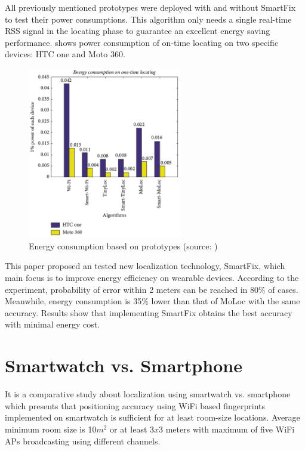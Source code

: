 All previously mentioned prototypes were deployed with and without SmartFix to test their power consumptions. This algorithm only needs a single real-time RSS signal in the locating phase to guarantee an excellent energy saving performance.  shows power consumption of on-time locating on two specific devices: HTC one and Moto 360. 

\begin{figure}[H]
	\begin{centering}
		\includegraphics[width=0.6\textwidth]{img/smart_fix}
		\par\end{centering}
	\caption{Energy consumption based on prototypes (source: \cite{SmartFix})\label{fig:SmartFix}}
	\label{fig01c03}
\end{figure}

This paper proposed an tested new localization technology, SmartFix, which main focus is to improve energy efficiency on wearable devices. According to the experiment, probability of error within 2 meters can be reached in 80\% of cases. Meanwhile, energy consumption is 35\% lower than that of MoLoc with the same accuracy. Results show that implementing SmartFix obtains the best accuracy with minimal energy cost.

\section{Smartwatch vs. Smartphone}\label{sec:SWvsSP}
It is a comparative study about localization using smartwatch vs. smartphone \cite{SWvsSP} which presents that positioning accuracy using WiFi based fingerprints implemented on smartwatch is sufficient for at least room-size locations. Average minimum room size is 10$m^2$ or at least 3$x$3 meters with maximum of five WiFi APs broadcasting using different channels.

